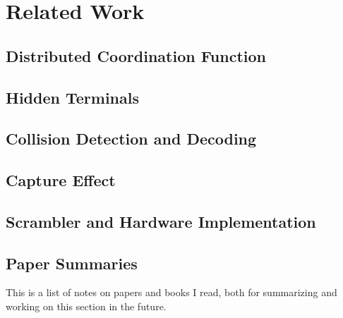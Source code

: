 
\chapter{Related Work}\label{ch:relatedwork}
\glsresetall %



\section{Distributed Coordination Function}



\section{Hidden Terminals}



\section{Collision Detection and Decoding}



\section{Capture Effect}



\section{Scrambler and Hardware Implementation}



\section{Paper Summaries}

This is a list of notes on papers and books I read, both for summarizing and working on this section in the future.


